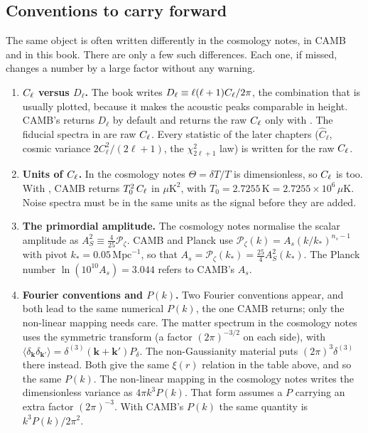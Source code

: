 \subsection{Conventions to carry forward}
\label{T1a:sec:conventions}

The same object is often written differently in the cosmology notes, in CAMB and in this book. There are only a few such differences. Each one, if missed, changes a number by a large factor without any warning.

\begin{enumerate}[leftmargin=1.6em,itemsep=3pt]
\item \textbf{$C_\ell$ versus $D_\ell$.} The book writes $D_\ell\equiv\ell(\ell+1)C_\ell/2\pi$, the combination that is usually plotted, because it makes the acoustic peaks comparable in height. CAMB's  returns $D_\ell$ by default and returns the raw $C_\ell$ only with . The fiducial spectra in  are raw $C_\ell$. Every statistic of the later chapters ($\widehat C_\ell$, cosmic variance $2C_\ell^2/(2\ell+1)$, the $\chi^2_{2\ell+1}$ law) is written for the raw $C_\ell$.
\item \textbf{Units of $C_\ell$.} In the cosmology notes $\Theta=\delta T/T$ is dimensionless, so $C_\ell$ is too. With , CAMB returns $T_0^2\,C_\ell$ in $\mu\mathrm{K}^2$, with $T_0=2.7255\,\mathrm K=2.7255\times10^6\,\mu\mathrm K$. Noise spectra must be in the same units as the signal before they are added.
\item \textbf{The primordial amplitude.} The cosmology notes normalise the scalar amplitude as $A_S^2\equiv\frac{4}{25}\mathcal P_\zeta$. CAMB and Planck use $\mathcal P_\zeta(k)=A_s(k/k_*)^{n_s-1}$ with pivot $k_*=0.05\,\mathrm{Mpc}^{-1}$, so that $A_s=\mathcal P_\zeta(k_*)=\frac{25}{4}A_S^2(k_*)$. The Planck number $\ln(10^{10}A_s)=3.044$ refers to CAMB's $A_s$.
\item \textbf{Fourier conventions and $P(k)$.} Two Fourier conventions appear, and both lead to the same numerical $P(k)$, the one CAMB returns; only the non-linear mapping needs care. The matter spectrum in the cosmology notes uses the symmetric transform (a factor $(2\pi)^{-3/2}$ on each side), with $\langle\delta_{\bm k}\delta_{\bm k'}\rangle=\delta^{(3)}(\bm k+\bm k')P_\delta$. The non-Gaussianity material puts $(2\pi)^3\delta^{(3)}$ there instead. Both give the same $\xi(r)$ relation in the table above, and so the same $P(k)$. The non-linear mapping in the cosmology notes writes the dimensionless variance as $4\pi k^3P(k)$. That form assumes a $P$ carrying an extra factor $(2\pi)^{-3}$. With CAMB's $P(k)$ the same quantity is $k^3P(k)/2\pi^2$.

\end{enumerate}
